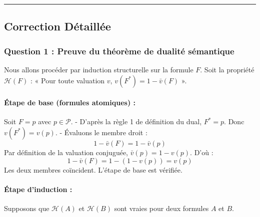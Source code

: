 \documentclass[11pt,a4paper]{article}
\begin{document}
\begin{center}\rule{0.5\linewidth}{0.5pt}\end{center}

\hypertarget{correction-duxe9tailluxe9e}{%
\subsection{Correction Détaillée}\label{correction-duxe9tailluxe9e}}

\hypertarget{question-1-preuve-du-thuxe9oruxe8me-de-dualituxe9-suxe9mantique}{%
\subsubsection{Question 1 : Preuve du théorème de dualité
sémantique}\label{question-1-preuve-du-thuxe9oruxe8me-de-dualituxe9-suxe9mantique}}

Nous allons procéder par induction structurelle sur la formule \(F\).
Soit la propriété \(\mathcal{H}(F)\) : « Pour toute valuation \(v\),
\(v(F^*) = 1 - \bar{v}(F)\) ».

\hypertarget{uxe9tape-de-base-formules-atomiques}{%
\paragraph{Étape de base (formules atomiques)
:}\label{uxe9tape-de-base-formules-atomiques}}

Soit \(F = p\) avec \(p \in \mathcal{P}\). - D'après la règle 1 de
définition du dual, \(F^* = p\). Donc \(v(F^*) = v(p)\). - Évaluons le
membre droit : \[1 - \bar{v}(F) = 1 - \bar{v}(p)\] Par définition de la
valuation conjuguée, \(\bar{v}(p) = 1 - v(p)\). D'où :
\[1 - \bar{v}(F) = 1 - (1 - v(p)) = v(p)\] Les deux membres coïncident.
L'étape de base est vérifiée.

\hypertarget{uxe9tape-dinduction}{%
\paragraph{Étape d'induction :}\label{uxe9tape-dinduction}}

Supposons que \(\mathcal{H}(A)\) et \(\mathcal{H}(B)\) sont vraies pour
deux formules \(A\) et \(B\).
\end{document}

